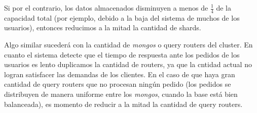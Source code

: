 Si por el contrario, los datos almacenados disminuyen a menos de $\frac{1}{4}$ de la capacidad total (por ejemplo,
debido a la baja del sistema de muchos de los usuarios), entonces reducimos a la mitad la cantidad de shards.

Algo similar sucederá con la cantidad de \emph{mongos} o query routers del cluster. En cuanto el sistema detecte que
el tiempo de respuesta ante los pedidos de los usuarios es lento duplicamos la cantidad de routers, ya que la 
cntidad actual no logran satisfacer las demandas de los clientes. En el caso de que haya gran cantidad de query routers
que no procesan ningún pedido (los pedidos se distribuyen de manera uniforme entre los \emph{mongos}, cuando
la base está bien balanceada), es momento de reducir a la mitad la cantidad de query routers.

